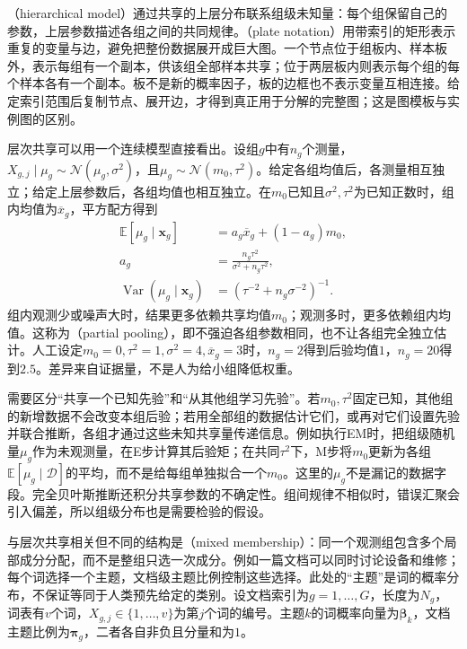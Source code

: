（hierarchical model）通过共享的上层分布联系组级未知量：每个组保留自己的参数，上层参数描述各组之间的共同规律。（plate notation）用带索引的矩形表示重复的变量与边，避免把整份数据展开成巨大图。一个节点位于组板内、样本板外，表示每组有一个副本，供该组全部样本共享；位于两层板内则表示每个组的每个样本各有一个副本。板不是新的概率因子，板的边框也不表示变量互相连接。给定索引范围后复制节点、展开边，才得到真正用于分解的完整图；这是图模板与实例图的区别。

层次共享可以用一个连续模型直接看出。设组$g$中有$n_g$个测量，$X_{g,j}\mid\mu_g\sim\mathcal{N}(\mu_g,\sigma^2)$，且$\mu_g\sim\mathcal{N}(m_0,\tau^2)$。给定各组均值后，各测量相互独立；给定上层参数后，各组均值也相互独立。在$m_0$已知且$\sigma^2,\tau^2$为已知正数时，组内均值为$\overline x_g$，平方配方得到
\begin{equation}
  \label{eq:pgm-static-directed-pooling}
  \begin{aligned}
    \mathbb{E}[\mu_g\mid\bm{x}_g]
      &=a_g\overline x_g+(1-a_g)m_0,\\
    a_g&=\frac{n_g\tau^2}{\sigma^2+n_g\tau^2},\\
    \operatorname{Var}(\mu_g\mid\bm{x}_g)
      &=\left(\tau^{-2}+n_g\sigma^{-2}\right)^{-1}.
  \end{aligned}
\end{equation}
组内观测少或噪声大时，结果更多依赖共享均值$m_0$；观测多时，更多依赖组内均值。这称为（partial pooling），即不强迫各组参数相同，也不让各组完全独立估计。人工设定$m_0=0,\tau^2=1,\sigma^2=4,\overline x_g=3$时，$n_g=2$得到后验均值$1$，$n_g=20$得到$2.5$。差异来自证据量，不是人为给小组降低权重。

需要区分“共享一个已知先验”和“从其他组学习先验”。若$m_0,\tau^2$固定已知，其他组的新增数据不会改变本组后验；若用全部组的数据估计它们，或再对它们设置先验并联合推断，各组才通过这些未知共享量传递信息。例如执行EM时，把组级随机量$\mu_g$作为未观测量，在E步计算其后验矩；在共同$\tau^2$下，M步将$m_0$更新为各组$\mathbb{E}[\mu_g\mid\mathcal{D}]$的平均，而不是给每组单独拟合一个$m_0$。这里的$\mu_g$不是漏记的数据字段。完全贝叶斯推断还积分共享参数的不确定性。组间规律不相似时，错误汇聚会引入偏差，所以组级分布也是需要检验的假设。

与层次共享相关但不同的结构是（mixed membership）：同一个观测组包含多个局部成分分配，而不是整组只选一次成分。例如一篇文档可以同时讨论设备和维修；每个词选择一个主题，文档级主题比例控制这些选择。此处的“主题”是词的概率分布，不保证等同于人类预先给定的类别。设文档索引为$g=1,\ldots,G$，长度为$N_g$，词表有$v$个词，$X_{g,j}\in\{1,\ldots,v\}$为第$j$个词的编号。主题$k$的词概率向量为$\bm{\beta}_k$，文档主题比例为$\bm{\pi}_g$，二者各自非负且分量和为$1$。

